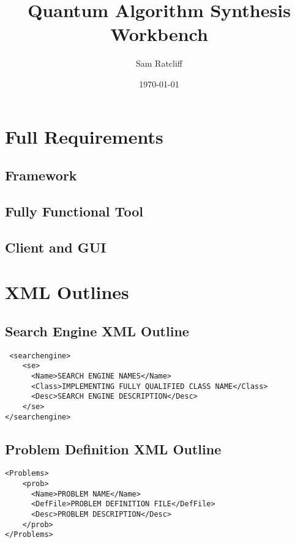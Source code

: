\documentclass[authoryearcitations]{UoYCSproject}
\author{Sam Ratcliff}
\title{Quantum Algorithm Synthesis Workbench}
\date{\today}
\begin{document}
\maketitle
\listoffigures
\listoftables














\appendix
\chapter{Full Requirements}
\label{sec:reqs}
\section{Framework}
\section{Fully Functional Tool}
\section{Client and GUI}

\chapter{XML Outlines}
\section{Search Engine XML Outline}
\label{sec:semanspecxml}
\lstset{language = XML}
\begin{lstlisting}
 <searchengine>
	<se>
	  <Name>SEARCH ENGINE NAMES</Name>
	  <Class>IMPLEMENTING FULLY QUALIFIED CLASS NAME</Class>
	  <Desc>SEARCH ENGINE DESCRIPTION</Desc>
	</se>
</searchengine>
\end{lstlisting}

\section{Problem Definition XML Outline}
\label{sec:probmanspecxml}
\lstset{language = XML}
\begin{lstlisting}
<Problems>
	<prob>
	  <Name>PROBLEM NAME</Name>
	  <DefFile>PROBLEM DEFINITION FILE</DefFile>
	  <Desc>PROBLEM DESCRIPTION</Desc>
	</prob>
</Problems>
\end{lstlisting}
\end{document}
